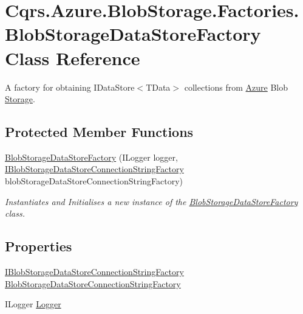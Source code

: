 \hypertarget{classCqrs_1_1Azure_1_1BlobStorage_1_1Factories_1_1BlobStorageDataStoreFactory}{}\section{Cqrs.\+Azure.\+Blob\+Storage.\+Factories.\+Blob\+Storage\+Data\+Store\+Factory Class Reference}
\label{classCqrs_1_1Azure_1_1BlobStorage_1_1Factories_1_1BlobStorageDataStoreFactory}


A factory for obtaining I\+Data\+Store$<$\+T\+Data$>$ collections from \hyperlink{namespaceCqrs_1_1Azure}{Azure} Blob \hyperlink{namespaceCqrs_1_1Azure_1_1Storage}{Storage}.  


\subsection*{Protected Member Functions}
\begin{DoxyCompactItemize}
\item 
\hyperlink{classCqrs_1_1Azure_1_1BlobStorage_1_1Factories_1_1BlobStorageDataStoreFactory_a448e77623db63d7a66fc6b6c75466eac_a448e77623db63d7a66fc6b6c75466eac}{Blob\+Storage\+Data\+Store\+Factory} (I\+Logger logger, \hyperlink{interfaceCqrs_1_1Azure_1_1BlobStorage_1_1DataStores_1_1IBlobStorageDataStoreConnectionStringFactory}{I\+Blob\+Storage\+Data\+Store\+Connection\+String\+Factory} blob\+Storage\+Data\+Store\+Connection\+String\+Factory)
\begin{DoxyCompactList}\small\item\em Instantiates and Initialises a new instance of the \hyperlink{classCqrs_1_1Azure_1_1BlobStorage_1_1Factories_1_1BlobStorageDataStoreFactory}{Blob\+Storage\+Data\+Store\+Factory} class. \end{DoxyCompactList}\end{DoxyCompactItemize}
\subsection*{Properties}
\begin{DoxyCompactItemize}
\item 
\hyperlink{interfaceCqrs_1_1Azure_1_1BlobStorage_1_1DataStores_1_1IBlobStorageDataStoreConnectionStringFactory}{I\+Blob\+Storage\+Data\+Store\+Connection\+String\+Factory} \hyperlink{classCqrs_1_1Azure_1_1BlobStorage_1_1Factories_1_1BlobStorageDataStoreFactory_a5df6d152d265ee439183ef60b3deb666_a5df6d152d265ee439183ef60b3deb666}{Blob\+Storage\+Data\+Store\+Connection\+String\+Factory}
\item 
I\+Logger \hyperlink{classCqrs_1_1Azure_1_1BlobStorage_1_1Factories_1_1BlobStorageDataStoreFactory_a18a5d0c661d5fd43c075a7c926aedf0f_a18a5d0c661d5fd43c075a7c926aedf0f}{Logger}
\end{DoxyCompactItemize}


